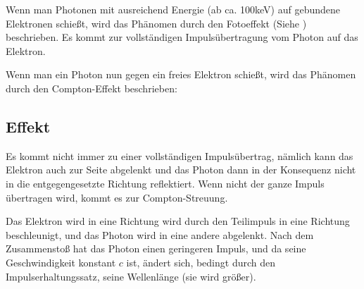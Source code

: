 Wenn man Photonen mit ausreichend Energie (ab ca. 100keV) auf gebundene Elektronen schießt, wird das Phänomen durch den Fotoeffekt (Siehe ) beschrieben. Es kommt zur vollständigen Impulsübertragung vom Photon auf das Elektron.

Wenn man ein Photon nun gegen ein freies Elektron schießt, wird das Phänomen durch den Compton-Effekt beschrieben:

\subsection{Effekt}

Es kommt nicht immer zu einer vollständigen Impulsübertrag, nämlich kann das Elektron auch zur Seite abgelenkt und das Photon dann in der Konsequenz nicht in die entgegengesetzte Richtung reflektiert. Wenn nicht der ganze Impuls übertragen wird, kommt es zur Compton-Streuung. 

Das Elektron wird in eine Richtung wird durch den Teilimpuls in eine Richtung beschleunigt, und das Photon wird in eine andere abgelenkt. Nach dem Zusammenstoß hat das Photon einen geringeren Impuls, und da seine Geschwindigkeit konstant $c$ ist, ändert sich, bedingt durch den Impulserhaltungssatz, seine Wellenlänge (sie wird größer).

\begin{comment}\item Durch den Impulserhaltungssatz gilt:\\
Vor Kollision:\\
$p_{gesamt} = p_{Phot} \rightarrow p_{gesamt}=\frac{h}{\lambda}$


Nach Kollision: \\
$p_{gesamt} = p'_{phot} + p_e$

$\frac{h}{\lambda} = \frac{h}{\lambda'} + m_e \cdot v$

$\frac{h}{\lambda} = \frac{h}{\lambda} \cdot \cos{\Theta} + \frac{h}{\lambda} \cdot (1-\cos{\Theta})$ \tabto{0.5\textwidth} ; $c = \lambda * f \rightarrow \lambda = c / f$

$\frac{h}{\lambda} = \frac{h}{\lambda} \cdot \cos{\Theta} + \frac{h}{\lambda} \cdot (1-\cos{\Theta})$





$m_e \cdot v = \frac{h}{\lambda}$ \tabto{0.5\textwidth} ; umstellen nach $\lambda$ 


$\lambda' = \lambda + \Delta\lambda$

$\lambda' - \lambda = \Delta\lambda$

$\lambda' - \lambda = $


$\lambda = \frac{h}{m_e \cdot v}$

\end{comment}

